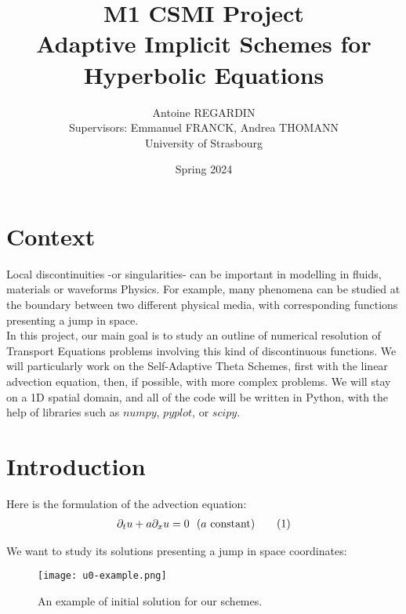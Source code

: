 \documentclass[12pt]{article}
\begin{document}
\def\spacingset#1{\renewcommand{\baselinestretch}%
{#1}\small\normalsize} \spacingset{1}

\title{\bf M1 CSMI Project\\ Adaptive Implicit Schemes for Hyperbolic Equations}
\author{Antoine REGARDIN\hspace{.2cm}\\
    Supervisors: Emmanuel FRANCK, Andrea THOMANN\\
    University of Strasbourg\\ }
\date{Spring 2024}
\maketitle

\section{Context}
Local discontinuities -or singularities- can be important in modelling in fluids, materials or waveforms Physics.
For example, many phenomena can be studied at the boundary between two different physical media,
with corresponding functions presenting a jump in space.\\
In this project, our main goal is to study an outline of numerical resolution of Transport Equations problems
involving this kind of discontinuous functions. We will particularly work on the Self-Adaptive Theta Schemes, 
first with the linear advection equation, then, if possible, with more complex problems.
We will stay on a 1D spatial domain, and all of the code will be written in Python, with the help of libraries such as $numpy$, $pyplot$, or $scipy$.
\vspace{10pt}

\section{Introduction}

Here is the formulation of the advection equation:
\begin{align*}
    \partial_t u + a\partial_x u = 0 \text{\space \space ($a$ constant)} \tag{1}
\end{align*}

\vspace{10pt}
We want to study its solutions presenting a jump in space coordinates:
\begin{figure}[H]
    \centering
    \texttt{[image: u0-example.png]}
    \caption{An example of initial solution for our schemes.}
\end{figure}
\end{document}
